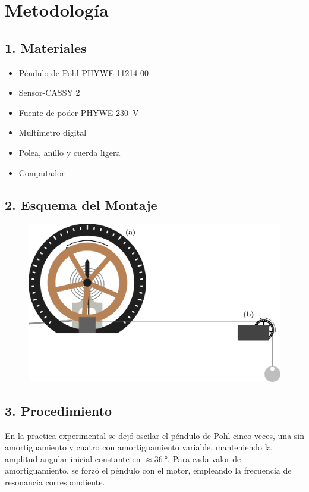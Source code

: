 \section*{Metodolog\'ia}

\subsection*{1. Materiales}
\begin{itemize}
	\item Péndulo de Pohl PHYWE 11214-00
	\item Sensor-CASSY 2
	\item Fuente de poder PHYWE \qty{230}{\volt}
	\item Multímetro digital
	\item Polea, anillo y cuerda ligera
	\item Computador
\end{itemize}

\subsection*{2. Esquema del Montaje}
\begin{figure}[H]
	\centering
	\includegraphics[width=\linewidth]{res/POHLFORZADO2.png}
	\label{fig:montaje}
\end{figure}

\subsection*{3. Procedimiento}
En la practica experimental se dejó oscilar el péndulo de Pohl cinco veces, una sin
amortiguamiento y cuatro con amortiguamiento variable, manteniendo la amplitud angular
inicial constante en $\approx\qty{36}{\degree}$. Para cada valor de amortiguamiento, se
forzó el péndulo con el motor, empleando la frecuencia de resonancia correspondiente.

